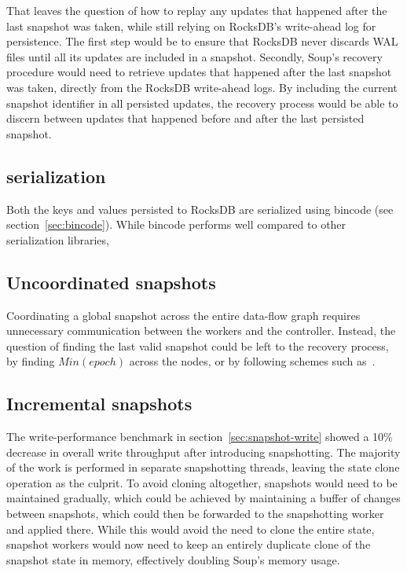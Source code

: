That leaves the question of how to replay any updates that happened after the
last snapshot was taken, while still relying on RocksDB's write-ahead log for
persistence. The first step would be to ensure that RocksDB never discards WAL
files until all its updates are included in a snapshot. Secondly, Soup's
recovery procedure would need to retrieve updates that happened after the last
snapshot was taken, directly from the RocksDB write-ahead logs. By including the
current snapshot identifier in all persisted updates, the recovery process would
be able to discern between updates that happened before and after the last
persisted snapshot.

\subsection{ serialization}

Both the keys and values persisted to RocksDB are serialized using
bincode (see section~\ref{sec:bincode}). While bincode performs well
compared to other serialization libraries,

\subsection{Uncoordinated snapshots}

Coordinating a global snapshot across the entire data-flow graph requires
unnecessary communication between the workers and the controller. Instead, the
question of finding the last valid snapshot could be left to the recovery
process, \eg by finding $ Min(epoch) $ across the nodes, or by following schemes
such as~\cite{falkirk}.

\subsection{Incremental snapshots}

The write-performance benchmark in section~\ref{sec:snapshot-write} showed a
10\% decrease in overall write throughput after introducing snapshotting. The
majority of the work is performed in separate snapshotting threads, leaving the
state clone operation as the culprit. To avoid cloning altogether, snapshots
would need to be maintained gradually, which could be achieved by maintaining a
buffer of changes between snapshots, which could then be forwarded to the
snapshotting worker and applied there. While this would avoid the need to clone
the entire state, snapshot workers would now need to keep an entirely duplicate
clone of the snapshot state in memory, effectively doubling Soup's memory usage.

